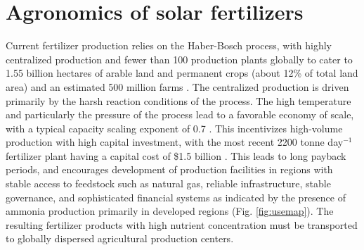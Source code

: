 \section{Agronomics of solar fertilizers}

Current fertilizer production relies on the Haber-Bosch process, with highly centralized production and fewer than 100 production plants globally \cite{McArthur_2017} to cater to 1.55 billion hectares of arable land and permanent crops (about 12\% of total land area) \cite{FAOSTAT_2018} and an estimated 500 million farms \cite{FAO_2014,Lowder_2016}. The centralized production is driven primarily by the harsh reaction conditions of the process. The high temperature and particularly the pressure of the process lead to a favorable economy of scale, with a typical capacity scaling exponent of 0.7 \cite{Ullmann_amm_2006, Berthouex_1972}. This incentivizes high-volume production with high capital investment, with the most recent 2200 tonne day$^{-1}$ fertilizer plant having a capital cost of \$1.5 billion \cite{northern_plains_2013}. This leads to long payback periods, and encourages development of production facilities in regions with stable access to feedstock such as natural gas, reliable infrastructure, stable governance, and sophisticated financial systems \cite{McArthur_2017} as indicated by the presence of ammonia production primarily in developed regions (Fig. \ref{fig:usemap}). The resulting fertilizer products with high nutrient concentration must be transported to globally dispersed agricultural production centers. 

